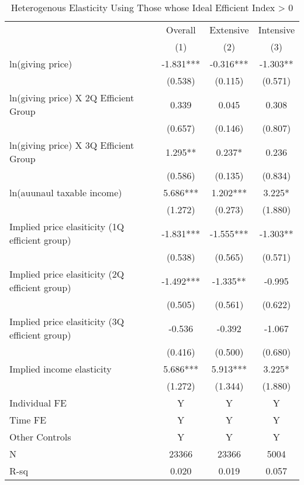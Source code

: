 \documentclass[ review  , 3p ]{elsarticle}
\begin{document}
  \begin{table}

  \caption{\label{tab:kableSubsetHeteroElasticity}Heterogenous Elasticity Using Those whose Ideal Efficient Index > 0}
  \centering
  \fontsize{8}{10}\selectfont
  \begin{threeparttable}
  \begin{tabular}[t]{lccc}
  \toprule
  \multicolumn{1}{c}{ } & \multicolumn{1}{c}{Overall} & \multicolumn{1}{c}{Extensive} & \multicolumn{1}{c}{Intensive} \\
  \cmidrule(l{3pt}r{3pt}){2-2} \cmidrule(l{3pt}r{3pt}){3-3} \cmidrule(l{3pt}r{3pt}){4-4}
   & (1) & (2) & (3)\\
  \midrule
  ln(giving price) & -1.831*** & -0.316*** & -1.303**\\
   & (0.538) & (0.115) & (0.571)\\
  ln(giving price) X 2Q Efficient Group & 0.339 & 0.045 & 0.308\\
   & (0.657) & (0.146) & (0.807)\\
  ln(giving price) X 3Q Efficient Group & 1.295** & 0.237* & 0.236\\
   & (0.586) & (0.135) & (0.834)\\
  ln(auunaul taxable income) & 5.686*** & 1.202*** & 3.225*\\
   & (1.272) & (0.273) & (1.880)\\
  Implied price elasiticity (1Q efficient group) & -1.831*** & -1.555*** & -1.303**\\
   & (0.538) & (0.565) & (0.571)\\
  Implied price elasiticity (2Q efficient group) & -1.492*** & -1.335** & -0.995\\
   & (0.505) & (0.561) & (0.622)\\
  Implied price elasiticity (3Q efficient group) & -0.536 & -0.392 & -1.067\\
   & (0.416) & (0.500) & (0.680)\\
  Implied income elasticity & 5.686*** & 5.913*** & 3.225*\\
   & (1.272) & (1.344) & (1.880)\\
  Individual FE & Y & Y & Y\\
  Time FE & Y & Y & Y\\
  Other Controls & Y & Y & Y\\
  N & 23366 & 23366 & 5004\\
  R-sq & 0.020 & 0.019 & 0.057\\
  \bottomrule
  \end{tabular}

\end{threeparttable}
\end{table}
\end{document}
